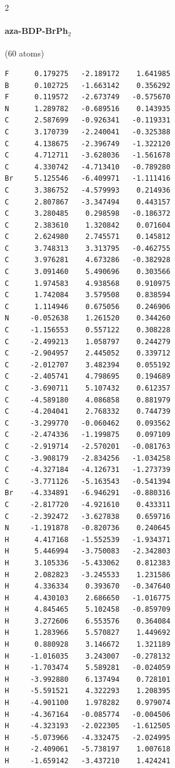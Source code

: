 \begin{multicols}{2}
\paragraph{aza-BDP-BrPh$_2$} (60 atoms)
{\scriptsize\linespread{1}\selectfont\begin{verbatim}
F      0.179275   -2.189172    1.641985
B      0.102725   -1.663142    0.356292
F      0.119572   -2.673749   -0.575670
N      1.289782   -0.689516    0.143935
C      2.587699   -0.926341   -0.119331
C      3.170739   -2.240041   -0.325388
C      4.138675   -2.396749   -1.322120
C      4.712711   -3.628036   -1.561678
C      4.330742   -4.713410   -0.789280
Br     5.125546   -6.409971   -1.111416
C      3.386752   -4.579993    0.214936
C      2.807867   -3.347494    0.443157
C      3.280485    0.298598   -0.186372
C      2.383610    1.320842    0.071604
C      2.624980    2.745571    0.145812
C      3.748313    3.313795   -0.462755
C      3.976281    4.673286   -0.382928
C      3.091460    5.490696    0.303566
C      1.974583    4.938568    0.910975
C      1.742084    3.579508    0.838594
C      1.114946    0.675056    0.246906
N     -0.052638    1.261520    0.344260
C     -1.156553    0.557122    0.308228
C     -2.499213    1.058797    0.244279
C     -2.904957    2.445052    0.339712
C     -2.012707    3.482394    0.055192
C     -2.405741    4.798695    0.194689
C     -3.690711    5.107432    0.612357
C     -4.589180    4.086858    0.881979
C     -4.204041    2.768332    0.744739
C     -3.299770   -0.060462    0.093562
C     -2.474336   -1.199875    0.097109
C     -2.919714   -2.570201   -0.081763
C     -3.908179   -2.834256   -1.034258
C     -4.327184   -4.126731   -1.273739
C     -3.771126   -5.163543   -0.541394
Br    -4.334891   -6.946291   -0.880316
C     -2.817720   -4.921610    0.433311
C     -2.392472   -3.627838    0.659716
N     -1.191878   -0.820736    0.240645
H      4.417168   -1.552539   -1.934371
H      5.446994   -3.750083   -2.342803
H      3.105336   -5.433062    0.812383
H      2.082823   -3.245533    1.231586
H      4.336334    0.393670   -0.347640
H      4.430103    2.686650   -1.016775
H      4.845465    5.102458   -0.859709
H      3.272606    6.553576    0.364084
H      1.283966    5.570827    1.449692
H      0.880928    3.146672    1.321189
H     -1.016035    3.243007   -0.278132
H     -1.703474    5.589281   -0.024059
H     -3.992880    6.137494    0.728101
H     -5.591521    4.322293    1.208395
H     -4.901100    1.978282    0.979074
H     -4.367164   -0.085774   -0.004506
H     -4.323193   -2.022305   -1.612505
H     -5.073966   -4.332475   -2.024995
H     -2.409061   -5.738197    1.007618
H     -1.659142   -3.437210    1.424241
\end{verbatim}}

\end{multicols}
